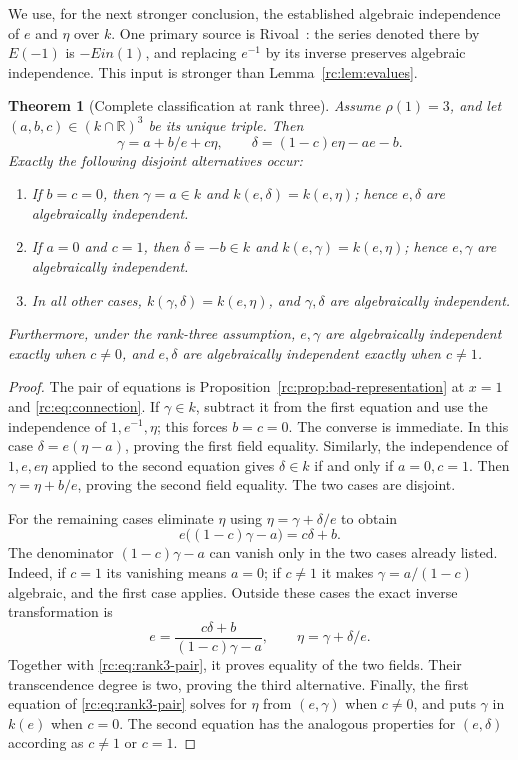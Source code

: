 \documentclass[11pt,a4paper]{article}
\newtheorem{theorem}{Theorem}[section]
\theoremstyle{definition}
\theoremstyle{remark}
\theoremstyle{plain}
\numberwithin{equation}{section}
\def\operatorname#1{#1}\def\mathrm#1{#1}}
\providecommand{\rcEin}{\operatorname{Ein}}
\providecommand{\rcR}{\mathbb R}
\begin{document}
We use, for the next stronger conclusion, the established algebraic
independence of $e$ and $\eta$ over $k$.  One primary source is
Rivoal~\cite[\S5(ii)]{rc:rivoal}: the series denoted there by $E(-1)$
is $-\rcEin(1)$, and replacing $e^{-1}$ by its inverse preserves algebraic
independence.  This input is stronger than Lemma~\ref{rc:lem:evalues}.

\begin{theorem}[Complete classification at rank three]\label{rc:thm:rank3}
Assume $\rho(1)=3$, and let $(a,b,c)\in(k\cap\rcR)^3$ be its unique
triple.  Then
\begin{equation}\label{rc:eq:rank3-pair}
 \gamma=a+b/e+c\eta,\qquad
 \delta=(1-c)e\eta-ae-b.
\end{equation}
Exactly the following disjoint alternatives occur:
\begin{enumerate}
 \item If $b=c=0$, then $\gamma=a\in k$ and
 $k(e,\delta)=k(e,\eta)$; hence $e,\delta$ are algebraically independent.
 \item If $a=0$ and $c=1$, then $\delta=-b\in k$ and
 $k(e,\gamma)=k(e,\eta)$; hence $e,\gamma$ are algebraically independent.
 \item In all other cases,
 $k(\gamma,\delta)=k(e,\eta)$, and $\gamma,\delta$ are algebraically
 independent.
\end{enumerate}
Furthermore, under the rank-three assumption, $e,\gamma$ are algebraically
independent exactly when $c\ne0$, and $e,\delta$ are algebraically
independent exactly when $c\ne1$.
\end{theorem}

\begin{proof}
The pair of equations is Proposition~\ref{rc:prop:bad-representation}
at $x=1$ and \eqref{rc:eq:connection}.  If $\gamma\in k$, subtract it
from the first equation and use the independence of $1,e^{-1},\eta$;
this forces $b=c=0$.  The converse is immediate.  In this case
$\delta=e(\eta-a)$, proving the first field equality.  Similarly,
the independence of $1,e,e\eta$ applied to the second equation gives
$\delta\in k$ if and only if $a=0,c=1$.  Then
$\gamma=\eta+b/e$, proving the second field equality.  The two cases
are disjoint.

For the remaining cases eliminate $\eta$ using
$\eta=\gamma+\delta/e$ to obtain
\begin{equation}\label{rc:eq:birational}
 e\bigl((1-c)\gamma-a\bigr)=c\delta+b.
\end{equation}
The denominator $(1-c)\gamma-a$ can vanish only in the two cases already
listed.  Indeed, if $c=1$ its vanishing means $a=0$; if $c\ne1$ it
makes $\gamma=a/(1-c)$ algebraic, and the first case applies.  Outside
these cases the exact inverse transformation is
\[
 e=\frac{c\delta+b}{(1-c)\gamma-a},\qquad
 \eta=\gamma+\delta/e.
\]
Together with \eqref{rc:eq:rank3-pair}, it proves equality of the two
fields.  Their transcendence degree is two, proving the third alternative.
Finally, the first equation of \eqref{rc:eq:rank3-pair} solves for $\eta$
from $(e,\gamma)$ when $c\ne0$, and puts $\gamma$ in $k(e)$ when $c=0$.
The second equation has the analogous properties for $(e,\delta)$
according as $c\ne1$ or $c=1$.
\end{proof}
\end{document}
